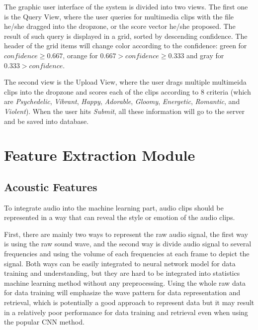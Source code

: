 \documentclass{report}
\begin{document}
The graphic user interface of the system is divided into two views. The first one is the Query View, where the user queries for multimedia clips with the file he/she dragged into the dropzone, or the score vector he/she proposed. The result of such query is displayed in a grid, sorted by descending confidence. The header of the grid items will change color according to the confidence: green for $confidence \geqslant 0.667$, orange for $0.667 > confidence \geqslant 0.333$ and gray for $0.333 > confidence$.

The second view is the Upload View, where the user drags multiple multimeida clips into the dropzone and scores each of the clips according to 8 criteria (which are \textit{Psychedelic}, \textit{Vibrant}, \textit{Happy}, \textit{Adorable}, \textit{Gloomy}, \textit{Energetic}, \textit{Romantic}, and \textit{Violent}). When the user hits \textit{Submit}, all these information will go to the server and be saved into database.

\section{Feature Extraction Module}

\subsection{Acoustic Features}

To integrate audio into the machine learning part, audio clips should be represented in a way that can reveal the style or emotion of the audio clips. 

First, there are mainly two ways to represent the raw audio signal, the first way is using the raw sound wave, and the second way is divide audio signal to several frequencies and using the volume of each frequencies at each frame to depict the signal. Both ways can be easily integrated to neural network model for data training and understanding, but they are hard to be integrated into statistics machine learning method without any preprocessing. Using the whole raw data for data training will emphasize the wave pattern for data representation and retrieval, which is potentially a good approach to represent data but it may result in a relatively poor performance for data training and retrieval even when using the popular CNN method.
\end{document}
